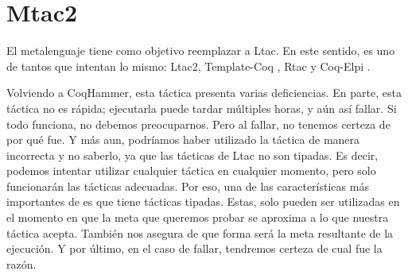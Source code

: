 \section{Mtac2}

El metalenguaje \Mtac \cite{DBLP:journals/pacmpl/KaiserZKRD18} tiene como objetivo reemplazar a Ltac.
En este sentido, es uno de tantos que intentan lo mismo: Ltac2, Template-Coq \cite{DBLP:conf/itp/AnandBCST18}, Rtac \cite{DBLP:conf/esop/MalechaB16} y Coq-Elpi \cite{tassi:hal-01637063}.

Volviendo a CoqHammer, esta táctica presenta varias deficiencias.
En parte, esta táctica no es rápida; ejecutarla puede tardar múltiples horas, y aún así fallar.
Si todo funciona, no debemos preocuparnos.
Pero al fallar, no tenemos certeza de por qué fue.
Y más aun, podríamos haber utilizado la táctica de manera incorrecta y no saberlo, ya que las tácticas de Ltac no son tipadas.
Es decir, podemos intentar utilizar cualquier táctica en cualquier momento, pero solo funcionarán las tácticas adecuadas.
Por eso, una de las características más importantes de \mtac es que tiene tácticas tipadas.
Estas, solo pueden ser utilizadas en el momento en que la meta que queremos probar se aproxima a lo que nuestra táctica acepta.
También nos asegura de que forma será la meta resultante de la ejecución.
Y por último, en el caso de fallar, tendremos certeza de cual fue la razón.

